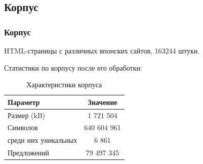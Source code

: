 \documentclass[aspectratio=169, pdf, 9pt, utf8]{beamer}
\begin{document}
\subsection{ Корпус }

\begin{frame}
	\frametitle{Корпус}
	
	
	HTML-страницы с различных японских сайтов, 163244 штуки.
	
	Статистики по корпусу после его обработки:
	
	\begin{table}[H]
		\begin{center}
			\begin{tabular}{|l|c|} \hline
				Параметр & Значение \\ \hline 
				Размер (kB) & 1 721 504 \\
				Символов & 640 604 961 \\
				среди них уникальных & 6 861 \\
				Предложений & 79 497 345	\\  \hline
			\end{tabular}
			\caption{Характеристики корпуса}
			\label{table:corpora}
		\end{center}
	\end{table}
\end{frame}
\end{document}

